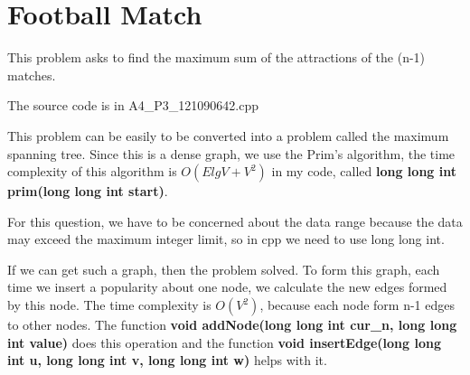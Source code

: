 \section{Football Match}
This problem asks to find the maximum sum of the attractions of the (n-1) matches. 

The source code is in A4\_P3\_121090642.cpp

This problem can be easily to be converted into a problem called the maximum spanning tree. Since this is a dense graph, we use the Prim's algorithm, the time complexity of this algorithm is $O(ElgV+V^2)$ in my code, called \textbf{long long int prim(long long int start)}.

For this question, we have to be concerned about the data range because the data may exceed the maximum integer limit, so in cpp we need to use long long int.

If we can get such a graph, then the problem solved. To form this graph, each time we insert a popularity about one node, we calculate the new edges formed by this node. The time complexity is $O(V^2)$, because each node form n-1 edges to other nodes. The function \textbf{void addNode(long long int cur\_n, long long int value)} does this operation and the function \textbf{void insertEdge(long long int u, long long int v, long long int w)} helps with it.